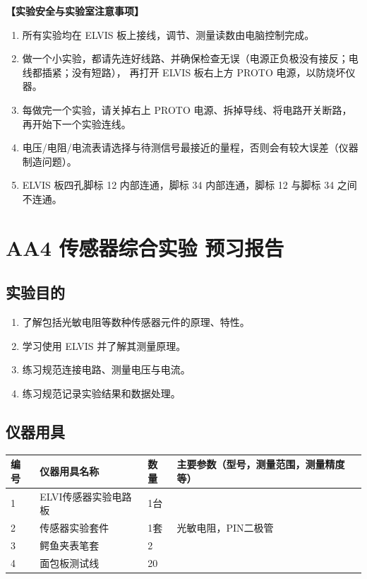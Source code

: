 \documentclass[dvipsnames, svgnames,a4paper,11pt]{article}
\begin{document}
{\textbf{【实验安全与实验室注意事项】}
\begin{enumerate}
	\item 所有实验均在 ELVIS 板上接线，调节、测量读数由电脑控制完成。
	\item {\color{red}做一个小实验，都请先连好线路、并确保检查无误（电源正负极没有接反；电线都插紧；没有短路），
    再打开 ELVIS 板右上方 PROTO 电源，以防烧坏仪器。}
	\item 每做完一个实验，请关掉右上 PROTO 电源、拆掉导线、将电路开关断路，再开始下一个实验连线。
    \item 电压/电阻/电流表请选择与待测信号最接近的量程，否则会有较大误差（仪器制造问题）。
    \item ELVIS 板四孔脚标 12 内部连通，脚标 34 内部连通，脚标 12 与脚标 34 之间不连通。
    
\end{enumerate}}

\clearpage
\tableofcontents
\clearpage

\setcounter{section}{0}
\section{AA4 传感器综合实验 \textbf{预习报告}}
	
\subsection{实验目的}
\begin{enumerate}
	\item 了解包括光敏电阻等数种传感器元件的原理、特性。
	\item 学习使用 ELVIS 并了解其测量原理。
	\item 练习规范连接电路、测量电压与电流。
	\item 练习规范记录实验结果和数据处理。
\end{enumerate}

\subsection{仪器用具}
\begin{table}[htbp]
	\centering
	\renewcommand\arraystretch{1.6}
	\begin{tabular}{p{}|p{}|p{}|p{}}
	\hline
	编号& 仪器用具名称 & 数量 &  主要参数（型号，测量范围，测量精度等） \\
	\hline
	1&ELVI传感器实验电路板&1台 &\\
	\hline
	2&传感器实验套件&1套&光敏电阻，PIN二极管\\
	\hline
	3&鳄鱼夹表笔套& 2 & \\
	\hline
	4&面包板测试线&20 &  \\
	\hline
\end{tabular}
\end{table}
\end{document}

